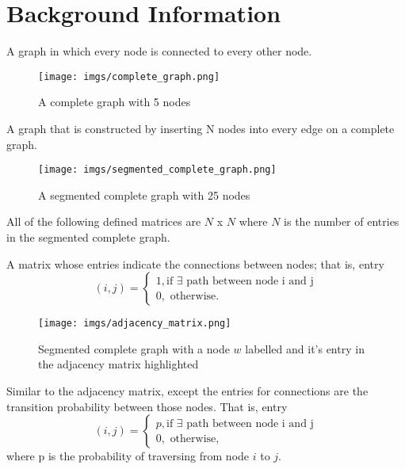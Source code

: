 \section{Background Information}
\begin{definition}
A graph in which every node is connected to every other node.
\end{definition}

\begin{figure}[H]
    \centering
    \texttt{[image: imgs/complete\_graph.png]}
    \caption[Complete Graph]{A complete graph with 5 nodes}
    \label{complete_graph}
\end{figure}

\begin{definition}
A graph that is constructed by inserting N nodes into every edge on a complete graph. 
\end{definition}
\begin{figure}[H]
    \centering
    \texttt{[image: imgs/segmented\_complete\_graph.png]}
    \caption[Segmented Complete Graph]{A segmented complete graph with 25 nodes}
    \label{segmented_complete_graph}
\end{figure}
All of the following defined matrices are $N$ x $N$ where $N$ is the number of entries in the segmented complete graph.
\begin{definition}
A matrix whose entries indicate the connections between nodes; that is, entry
$$
(i, j) = \begin{cases}
1, \text{if } \exists \text{ path between node i and j}\\
0, \text{ otherwise.}
\end{cases}
$$
\end{definition}
\begin{figure}[H]
    \centering
    \texttt{[image: imgs/adjacency\_matrix.png]}
    \caption[Adjacency Matrix]{Segmented complete graph with a node $w$ labelled and it’s entry in the adjacency matrix highlighted}
    \label{adjacency_matrix}
\end{figure}
\begin{definition}
Similar to the adjacency matrix, except the entries for connections are the transition probability between those nodes. That is, entry
$$
(i, j) = \begin{cases}
p, \text{if } \exists \text{ path between node i and j}\\
0, \text{ otherwise,}
\end{cases}
$$
where p is the probability of traversing from node $i$ to $j$. 
\end{definition}
